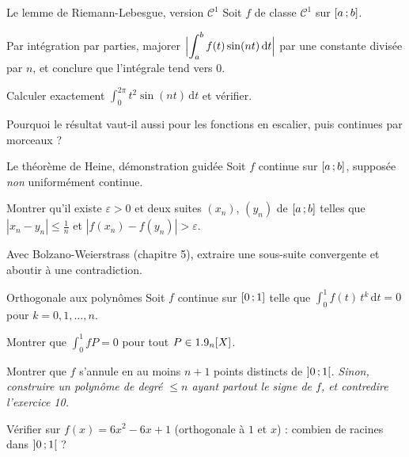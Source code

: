 \begin{exercice}[3]{Le lemme de Riemann-Lebesgue, version $\mathcal{C}^{1}$}
Soit $f$ de classe $\mathcal{C}^{1}$ sur $\mathopen{[}a\,{;}\,b\mathclose{]}$.
\begin{questions}
  \item Par intégration par parties, majorer
    $\Bigl|\displaystyle\int_{a}^{b}f(t)\sin(nt)\,\mathrm{d}t\Bigr|$ par
    une constante divisée par $n$, et conclure que l'intégrale tend vers
    $0$.
  \item Calculer exactement
    $\displaystyle\int_{0}^{2\pi}t^{2}\sin(nt)\,\mathrm{d}t$ et vérifier.
  \item Pourquoi le résultat vaut-il aussi pour les fonctions en escalier,
    puis continues par morceaux ?
\end{questions}
\end{exercice}

\begin{exercice}[3]{Le théorème de Heine, démonstration guidée}
Soit $f$ continue sur $\mathopen{[}a\,{;}\,b\mathclose{]}$, supposée \emph{non} uniformément
continue.
\begin{questions}
  \item Montrer qu'il existe $\varepsilon>0$ et deux suites $(x_n)$,
    $(y_n)$ de $\mathopen{[}a\,{;}\,b\mathclose{]}$ telles que $|x_n-y_n|\leqslant\frac1n$ et
    $|f(x_n)-f(y_n)|>\varepsilon$.
  \item Avec Bolzano-Weierstrass (chapitre 5), extraire une sous-suite
    convergente et aboutir à une contradiction.
\end{questions}
\end{exercice}

\begin{exercice}[3]{Orthogonale aux polynômes}
Soit $f$ continue sur $\mathopen{[}0\,{;}\,1\mathclose{]}$ telle que
$\displaystyle\int_{0}^{1}f(t)\,t^{k}\,\mathrm{d}t=0$ pour
$k=0,1,\dots,n$.
\begin{questions}
  \item Montrer que $\displaystyle\int_{0}^{1}fP=0$ pour tout
    $P\in1.9_n[X]$.
  \item Montrer que $f$ s'annule en au moins $n+1$ points distincts de
    $\mathopen{]}0\,{;}\,1\mathclose{[}$. \emph{Sinon, construire un polynôme de degré
    $\leqslant n$ ayant partout le signe de $f$, et contredire
    l'exercice 10.}
  \item Vérifier sur $f(x)=6x^{2}-6x+1$ (orthogonale à $1$ et $x$) :
    combien de racines dans $\mathopen{]}0\,{;}\,1\mathclose{[}$ ?
\end{questions}
\end{exercice}

